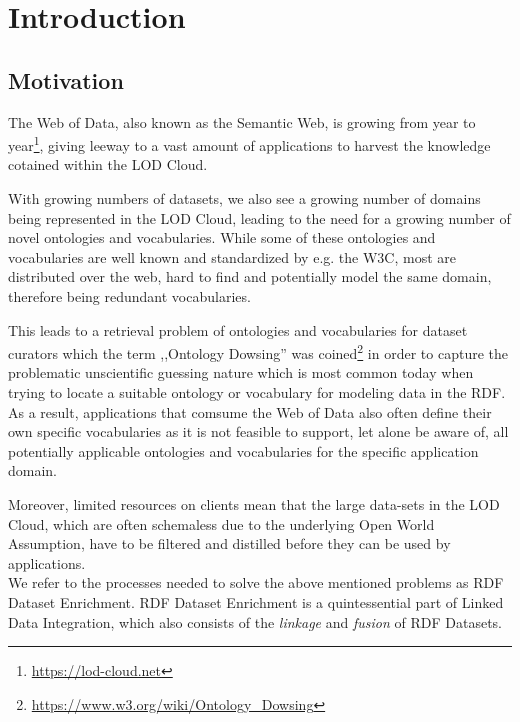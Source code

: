 \chapter{Introduction}
\label{ch:intro}
\section{Motivation}
\label{sec:motivation}
The Web of Data, also known as the Semantic Web, is growing from year to year\footnote{\url{https://lod-cloud.net}},
  giving leeway to a vast amount of applications to harvest the knowledge cotained within the \ac{LOD} Cloud.
  
With growing numbers of datasets, we also see a growing number of domains being represented in the \ac{LOD} Cloud, leading to the need for a growing number of novel ontologies and vocabularies.
While some of these ontologies and vocabularies are well known and standardized by e.g. the \ac{W3C}, most are distributed over the web, hard to find and potentially model the same domain, therefore being redundant vocabularies.

This leads to a retrieval problem of ontologies and vocabularies for dataset curators which the term ,,Ontology Dowsing'' was coined\footnote{\url{https://www.w3.org/wiki/Ontology_Dowsing}} in order to capture the problematic unscientific guessing nature which is most common today when trying to locate a suitable ontology or vocabulary for modeling data in the \ac{RDF}.
As a result, applications that comsume the Web of Data also often define their own specific vocabularies as it is not feasible to support, let alone be aware of, all potentially applicable ontologies and vocabularies for the specific application domain.

Moreover, limited resources on clients mean that the large data-sets in the \ac{LOD} Cloud, which are often schemaless due to the underlying Open World Assumption, have to be filtered and distilled before they can be used by applications.\\

We refer to the processes needed to solve the above mentioned problems as \ac{RDF} Dataset Enrichment.
\ac{RDF} Dataset Enrichment is a quintessential part of Linked Data Integration, which also consists of the \emph{linkage} and \emph{fusion} of \ac{RDF} Datasets.

